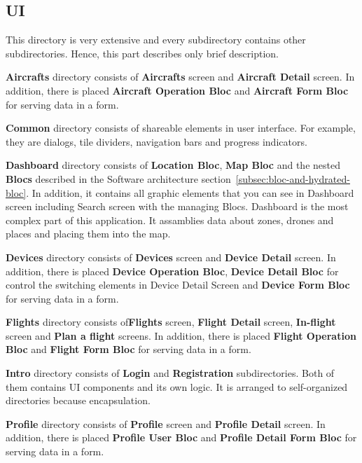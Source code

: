 \subsection{UI}\label{subsec:ui}
This directory is very extensive and every subdirectory contains other subdirectories.
Hence, this part describes only brief description.


\textbf{Aircrafts} directory consists of \textbf{Aircrafts} screen and \textbf{Aircraft Detail} screen.
In addition, there is placed \textbf{Aircraft Operation Bloc} and \textbf{Aircraft Form Bloc} for serving data in a form.


\textbf{Common} directory consists of shareable elements in user interface.
For example, they are dialogs, tile dividers, navigation bars and progress indicators.


\textbf{Dashboard} directory consists of \textbf{Location Bloc}, \textbf{Map Bloc} and the nested \textbf{Blocs} described in the Software architecture section~\ref{subsec:bloc-and-hydrated-bloc}.
In addition, it contains all graphic elements that you can see in Dashboard screen including Search screen with the managing Blocs.
Dashboard is the most complex part of this application.
It assamblies data about zones, drones and places and placing them into the map.


\textbf{Devices} directory consists of \textbf{Devices} screen and \textbf{Device Detail} screen.
In addition, there is placed \textbf{Device Operation Bloc}, \textbf{Device Detail Bloc} for control the switching elements in Device Detail Screen and \textbf{Device Form Bloc} for serving data in a form.


\textbf{Flights} directory consists of\textbf{Flights} screen, \textbf{Flight Detail} screen, \textbf{In-flight} screen and \textbf{Plan a flight} screens.
In addition, there is placed \textbf{Flight Operation Bloc} and \textbf{Flight Form Bloc} for serving data in a form.


\textbf{Intro} directory consists of \textbf{Login} and \textbf{Registration} subdirectories.
Both of them contains UI components and its own logic.
It is arranged to self-organized directories because encapsulation.


\textbf{Profile} directory consists of \textbf{Profile} screen and \textbf{Profile Detail} screen.
In addition, there is placed \textbf{Profile User Bloc} and \textbf{Profile Detail Form Bloc} for serving data in a form.

